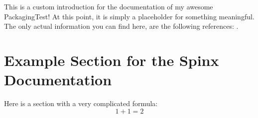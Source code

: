 This is a custom introduction for the documentation of my awesome PackagingTest!
At this point, it is simply a placeholder for something meaningful. The only actual
information you can find here, are the following references: \cite{Foell90}.


\section{Example Section for the Spinx Documentation}

Here is a section with a very complicated formula:
\begin{equation}
1 + 1 = 2
\end{equation}
